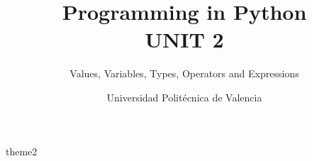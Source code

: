 \documentclass[fontsize=10pt,a4paper]{scrartcl}
\title{Programming in Python\\ UNIT 2}
\subtitle{\Large{Values, Variables, Types, Operators and Expressions}}
\author{Universidad Politécnica de Valencia}
\date{\academicyear}
\begin{document}
\maketitle
\tableofcontents


{theme2}

\end{document}
